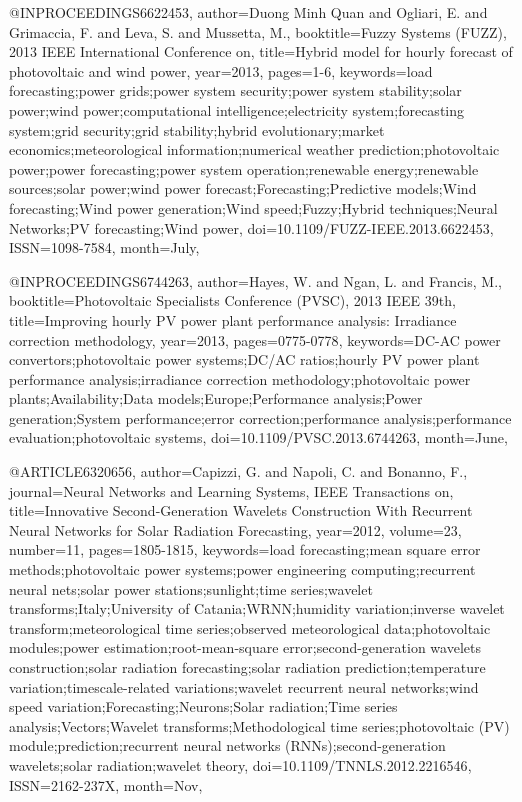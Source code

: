 @INPROCEEDINGS{6622453, 
author={Duong Minh Quan and Ogliari, E. and Grimaccia, F. and Leva, S. and Mussetta, M.}, 
booktitle={Fuzzy Systems (FUZZ), 2013 IEEE International Conference on}, 
title={Hybrid model for hourly forecast of photovoltaic and wind power}, 
year={2013}, 
pages={1-6}, 
keywords={load forecasting;power grids;power system security;power system stability;solar power;wind power;computational intelligence;electricity system;forecasting system;grid security;grid stability;hybrid evolutionary;market economics;meteorological information;numerical weather prediction;photovoltaic power;power forecasting;power system operation;renewable energy;renewable sources;solar power;wind power forecast;Forecasting;Predictive models;Wind forecasting;Wind power generation;Wind speed;Fuzzy;Hybrid techniques;Neural Networks;PV forecasting;Wind power}, 
doi={10.1109/FUZZ-IEEE.2013.6622453}, 
ISSN={1098-7584}, 
month={July},}

@INPROCEEDINGS{6744263, 
author={Hayes, W. and Ngan, L. and Francis, M.}, 
booktitle={Photovoltaic Specialists Conference (PVSC), 2013 IEEE 39th}, 
title={Improving hourly PV power plant performance analysis: Irradiance correction methodology}, 
year={2013}, 
pages={0775-0778}, 
keywords={DC-AC power convertors;photovoltaic power systems;DC/AC ratios;hourly PV power plant performance analysis;irradiance correction methodology;photovoltaic power plants;Availability;Data models;Europe;Performance analysis;Power generation;System performance;error correction;performance analysis;performance evaluation;photovoltaic systems}, 
doi={10.1109/PVSC.2013.6744263}, 
month={June},}

@ARTICLE{6320656, 
author={Capizzi, G. and Napoli, C. and Bonanno, F.}, 
journal={Neural Networks and Learning Systems, IEEE Transactions on}, 
title={Innovative Second-Generation Wavelets Construction With Recurrent Neural Networks for Solar Radiation Forecasting}, 
year={2012}, 
volume={23}, 
number={11}, 
pages={1805-1815}, 
keywords={load forecasting;mean square error methods;photovoltaic power systems;power engineering computing;recurrent neural nets;solar power stations;sunlight;time series;wavelet transforms;Italy;University of Catania;WRNN;humidity variation;inverse wavelet transform;meteorological time series;observed meteorological data;photovoltaic modules;power estimation;root-mean-square error;second-generation wavelets construction;solar radiation forecasting;solar radiation prediction;temperature variation;timescale-related variations;wavelet recurrent neural networks;wind speed variation;Forecasting;Neurons;Solar radiation;Time series analysis;Vectors;Wavelet transforms;Methodological time series;photovoltaic (PV) module;prediction;recurrent neural networks (RNNs);second-generation wavelets;solar radiation;wavelet theory}, 
doi={10.1109/TNNLS.2012.2216546}, 
ISSN={2162-237X}, 
month={Nov},}

